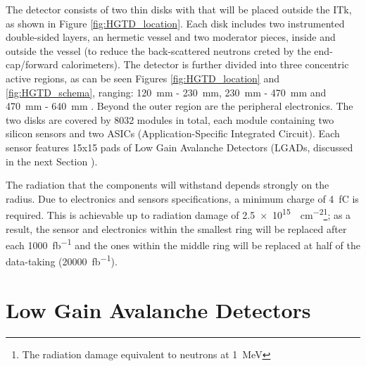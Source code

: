 The detector consists of two thin disks with that will be placed outside the ITk, as shown in Figure \ref{fig:HGTD_location}. Each disk includes two instrumented double-sided layers, an hermetic vessel and two moderator pieces, inside and outside the vessel (to reduce the back-scattered neutrons creted by the end-cap/forward calorimeters). The detector is further divided into three concentric active regions, as can be seen Figures \ref{fig:HGTD_location} and \ref{fig:HGTD_schema}, ranging: \qty{120}{\milli\meter} - \qty{230}{\milli\meter}, \qty{230}{\milli\meter} - \qty{470}{\milli\meter} and \qty{470}{\milli\meter} - \qty{640}{\milli\meter} \cite{CERN-LHCC-2020-007}. Beyond the outer region are the peripheral electronics.
The two disks are covered by 8032 modules in total, each module containing two silicon sensors and two ASICs (Application-Specific Integrated Circuit). Each sensor features 15x15 pads of Low Gain Avalanche Detectors (LGADs, discussed in the next Section ).

The radiation that the components will withstand depends strongly on the radius. Due to electronics and sensors specifications, a minimum charge of \qty{4}{\femto\coulomb} is required. This is achievable up to radiation damage of \qty{2.5e15}{\neutroneq\centi\meter^{-2}}\footnote{The radiation damage equivalent to neutrons at \qty{1}{\mega\electronvolt}}; as a result, the sensor and electronics within the smallest ring will be replaced after each \qty{1000}{\femto\barn^{-1}} and the ones within the middle ring will be replaced at half of the data-taking (\qty{20000}{\femto\barn^{-1}}).





\section{Low Gain Avalanche Detectors}

